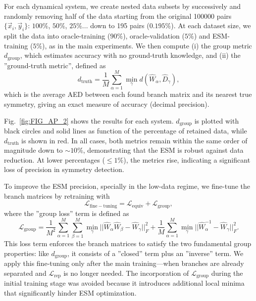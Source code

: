 For each dynamical system, we create nested data subsets by successively and randomly removing half of the data starting from the original 100000 pairs $\{\vec{x}_i , \vec{y}_i \}$: $100 \%$, $50 \%$, $25 \%$... down to 195 pairs ($0.195 \%$). At each dataset size, we split the data into oracle-training ($90\%$), oracle-validation ($5\%$) and ESM-training ($5\%$), as in the main experiments. We then compute (i) the group metric $d_{\mathrm{group}}$, which estimates accuracy with no ground-truth knowledge, and (ii) the ''ground-truth metric'', defined as
\begin{equation}\label{eq:d_truth}
  d_{\mathrm{truth}} = \frac{1}{M} \sum_{\alpha = 1}^M \min_{\gamma} d \left( \hat{W}_{\alpha} , \hat{D}_{\gamma} \right),
\end{equation}
which is the average AED between each found branch matrix and its nearest true symmetry, giving an exact measure of accuracy (decimal precision).

Fig.~\ref{fig:FIG_AP_2} shows the results for each system. $d_{\mathrm{group}}$ is plotted with black circles and solid lines as function of the percentage of retained data, while $d_{\mathrm{truth}}$ is shown in red. In all cases, both metrics remain within the same order of magnitude down to $\sim 10 \%$, demonstrating that the ESM is robust against data reduction. At lower percentages ($\leq 1 \%$), the metrics rise, indicating a significant loss of precision in symmetry detection.

To improve the ESM precision, specially in the low-data regime, we fine-tune the branch matrices by retraining with
\begin{equation}\label{eq:L_fine_tun}
  \mathcal{L}_{\mathrm{fine-tuning}} = \mathcal{L}_{\mathrm{equiv}} + \mathcal{L}_{\mathrm{group}},
\end{equation}
where the ''group loss'' term is defined as
\begin{equation}
  \label{eq:L_group} 
  \mathcal{L}_{\mathrm{group}} = \frac{1}{M^2}\sum_{\alpha = 1}^M \sum_{\beta = 1}^M \min_{\gamma} || \hat{W}_{\alpha} \hat{W}_{\beta} - \hat{W}_{\gamma} ||^2_{F} + \frac{1}{M} \sum_{\alpha = 1}^M \min_{\gamma} || \hat{W}_{\alpha}^{-1} - \hat{W}_{\gamma} ||^2_{F}.
\end{equation}
This loss term enforces the branch matrices to satisfy the two fundamental group properties: like $d_{\mathrm{group}}$, it consists of a ''closed'' term plus an ''inverse'' term. We apply this fine‐tuning only after the main training—when branches are already separated and $\mathcal{L}_{\mathrm{rep}}$ is no longer needed. The incorporation of $\mathcal{L}_{\mathrm{group}}$ during the initial training stage was avoided because it introduces additional local minima that significantly hinder ESM optimization.

